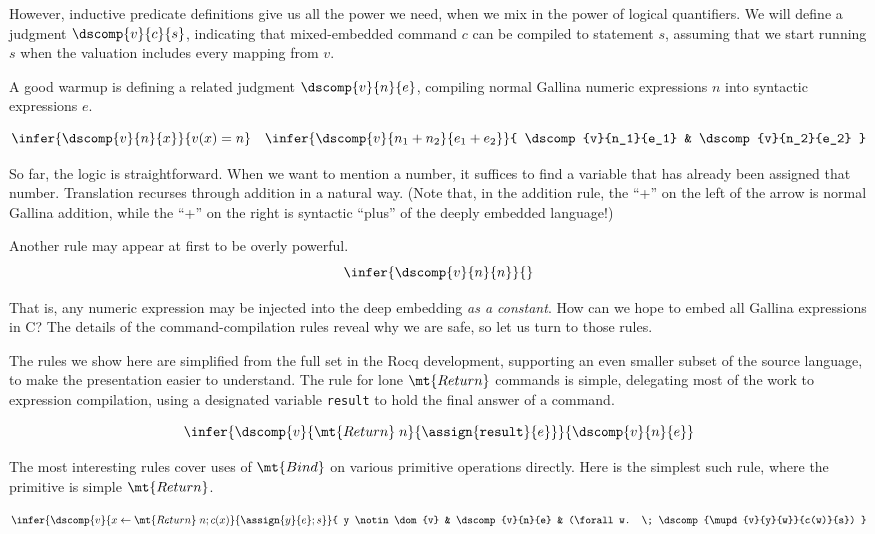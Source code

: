 \documentclass{amsbook}
\theoremstyle{definition}
\theoremstyle{remark}
\numberwithin{section}{chapter}
\numberwithin{equation}{chapter}
\begin{document}
However, inductive predicate definitions give us all the power we need, when we mix in the power of logical quantifiers.
We will define a judgment $\dscomp{v}{c}{s}$, indicating that mixed-embedded command $c$ can be compiled to statement $s$, assuming that we start running $s$ when the valuation includes every mapping from $v$.

A good warmup is defining a related judgment $\dscomp{v}{n}{e}$, compiling normal Gallina numeric expressions $n$ into syntactic expressions $e$.

$$\infer{\dscomp{v}{n}{x}}{
  v(x) = n
}
\quad \infer{\dscomp{v}{n_1 + n_2}{e_1 + e_2}}{
  \dscomp{v}{n_1}{e_1}
  & \dscomp{v}{n_2}{e_2}
}$$

So far, the logic is straightforward.
When we want to mention a number, it suffices to find a variable that has already been assigned that number.
Translation recurses through addition in a natural way.
(Note that, in the addition rule, the ``+'' on the left of the arrow is normal Gallina addition, while the ``+'' on the right is syntactic ``plus'' of the deeply embedded language!)

Another rule may appear at first to be overly powerful.
$$\infer{\dscomp{v}{n}{n}}{}$$

That is, any numeric expression may be injected into the deep embedding \emph{as a constant}.
How can we hope to embed all Gallina expressions in C?
The details of the command-compilation rules reveal why we are safe, so let us turn to those rules.

The rules we show here are simplified from the full set in the Rocq development, supporting an even smaller subset of the source language, to make the presentation easier to understand.
The rule for lone $\mt{Return}$ commands is simple, delegating most of the work to expression compilation, using a designated variable \texttt{result} to hold the final answer of a command.

$$\infer{\dscomp{v}{\mt{Return} \; n}{\assign{\texttt{result}}{e}}}{
  \dscomp{v}{n}{e}
}$$

The most interesting rules cover uses of $\mt{Bind}$ on various primitive operations directly.
Here is the simplest such rule, where the primitive is simple $\mt{Return}$.

$$\infer{\dscomp{v}{x \leftarrow \mt{Return} \; n; c(x)}{\assign{y}{e}; s}}{
    y \notin \dom{v}
    & \dscomp{v}{n}{e}
    & (\forall w. \; \dscomp{\mupd{v}{y}{w}}{c(w)}{s})
}$$
\end{document}
